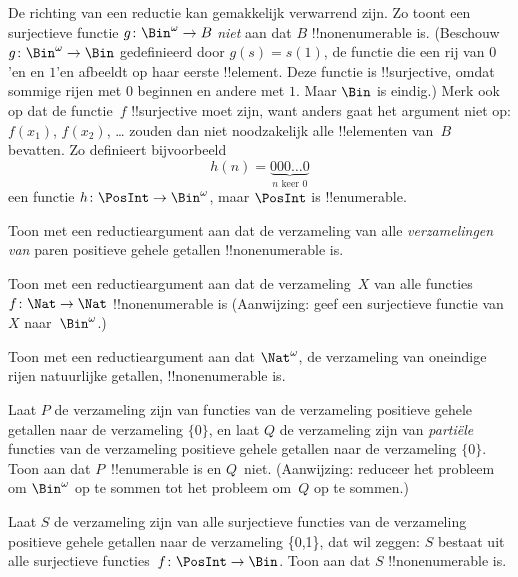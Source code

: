 \documentclass[openany]{memoir}
\begin{document}
\begin{explain}
De richting van een reductie kan gemakkelijk verwarrend zijn. Zo toont
een surjectieve functie $g \colon
\Bin^\omega \to B$ 
\emph{niet} aan dat $B$ !!{nonenumerable} is. (Beschouw $g \colon
\Bin^\omega \to \Bin$ gedefinieerd door $g(s) = s(1)$, de functie die
een rij van $0$'en en $1$'en afbeeldt op haar eerste !!{element}. Deze
functie is !!{surjective}, omdat sommige rijen met $0$ beginnen en
andere met $1$. Maar $\Bin$ is eindig.) Merk ook op dat de functie~$f$
!!{surjective} moet zijn, want anders gaat het argument niet op:
$f(x_1)$, $f(x_2)$, \dots{} zouden dan niet noodzakelijk alle
!!{element}en van~$B$ bevatten. Zo definieert bijvoorbeeld
\[
h(n) = \underbrace{000\dots0}_{\text{$n$ keer $0$}}
\]
een functie $h\colon \PosInt \to \Bin^\omega$, maar $\PosInt$ is
!!{enumerable}.
\end{explain}

\begin{prob}
Toon met een reductieargument aan dat de verzameling van alle
\emph{verzamelingen van} paren positieve gehele getallen
!!{nonenumerable} is.
\end{prob}

\begin{prob}\label{sfr:siz:red:prob:nat-nat}
  Toon met een reductieargument aan dat de verzameling~$X$ van alle
  functies $f\colon \Nat \to \Nat$ !!{nonenumerable} is (Aanwijzing:
  geef een surjectieve functie van $X$ naar~$\Bin^\omega$.)
\end{prob}

\begin{prob}
Toon met een reductieargument aan dat $\Nat^\omega$, de verzameling van
oneindige rijen natuurlijke getallen, !!{nonenumerable} is.
\end{prob}

\begin{prob}
Laat $P$ de verzameling zijn van functies van de verzameling positieve
gehele getallen naar de verzameling $\{0\}$, en laat $Q$ de verzameling
zijn van \emph{partiële} functies van de verzameling positieve gehele
getallen naar de verzameling $\{0\}$. Toon aan dat $P$~!!{enumerable}
is en $Q$~niet. (Aanwijzing: reduceer het probleem om $\Bin^\omega$ op
te sommen tot het probleem om~$Q$ op te sommen.)
\end{prob}

\begin{prob}
Laat $S$ de verzameling zijn van alle surjectieve functies van de
verzameling positieve gehele getallen naar de verzameling \{0,1\}, dat
wil zeggen: $S$ bestaat uit alle surjectieve functies~$f\colon
\PosInt \to \Bin$. Toon aan dat $S$ !!{nonenumerable} is.
\end{prob}
\end{document}
